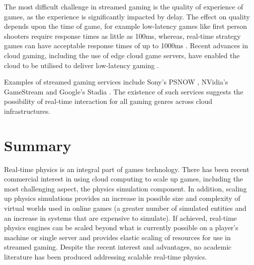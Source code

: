 The most difficult challenge in streamed gaming is the quality of experience of games, as the experience is significantly impacted by delay\cite{StormInCloudGaming}. The effect on quality depends upon the time of game, for example low-latency games like first person shooters require response times as little as 100ms, whereas, real-time strategy games can have acceptable response times of up to 1000ms \cite{CloudGamingArchPerf}. Recent advances in cloud gaming, including the use of edge cloud game servers, have enabled the cloud to be utilised to deliver low-latency gaming \cite{TimelyCloudGaming}.

Examples of streamed gaming services include Sony's PSNOW \cite{PSNOW}, NVidia's GameStream \cite{NVidiaGameStream} and Google's Stadia \cite{Stadia}. The existence of such services suggests the possibility of real-time interaction for all gaming genres across cloud infrastructures.




\section{Summary}
Real-time physics is an integral part of games technology. There has been recent commercial interest in using cloud computing to scale up games, including the most challenging aspect, the physics simulation component. In addition, scaling up physics simulations provides an increase in possible size and complexity of virtual worlds used in online games (a greater number of simulated entities and an increase in systems that are expensive to simulate). If achieved, real-time physics engines can be scaled beyond what is currently possible on a player's machine or single server and provides elastic scaling of resources for use in streamed gaming. Despite the recent interest and advantages, no academic literature has been produced addressing scalable real-time physics.

